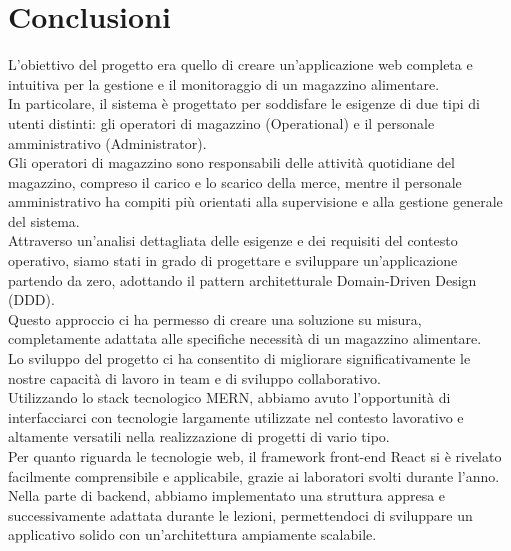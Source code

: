 \newpage
\section{Conclusioni}

L’obiettivo del progetto era quello di creare un’applicazione web completa e intuitiva per la gestione e il monitoraggio di un magazzino alimentare.
\\In particolare, il sistema è progettato per soddisfare le esigenze di due tipi di utenti distinti: gli operatori di
magazzino (Operational) e il personale amministrativo (Administrator).\\ Gli operatori di magazzino sono responsabili
delle attività quotidiane del magazzino, compreso il carico e lo scarico della merce, mentre il personale amministrativo
ha compiti più orientati alla supervisione e alla gestione generale del sistema.\\

Attraverso un'analisi dettagliata delle esigenze e dei requisiti del contesto operativo, siamo stati in grado di
progettare e sviluppare un'applicazione partendo da zero, adottando il pattern architetturale Domain-Driven Design (DDD).\\
Questo approccio ci ha permesso di creare una soluzione su misura, completamente adattata alle specifiche necessità di un magazzino alimentare.\\

Lo sviluppo del progetto ci ha consentito di migliorare significativamente le nostre capacità di lavoro in team e di sviluppo collaborativo.\\
Utilizzando lo stack tecnologico MERN, abbiamo avuto l'opportunità di interfacciarci con tecnologie largamente utilizzate nel contesto lavorativo
e altamente versatili nella realizzazione di progetti di vario tipo.\\

Per quanto riguarda le tecnologie web, il framework front-end React si è rivelato facilmente comprensibile e applicabile,
grazie ai laboratori svolti durante l'anno. Nella parte di backend, abbiamo implementato una struttura appresa e successivamente
adattata durante le lezioni, permettendoci di sviluppare un applicativo solido con un'architettura ampiamente scalabile.\\

